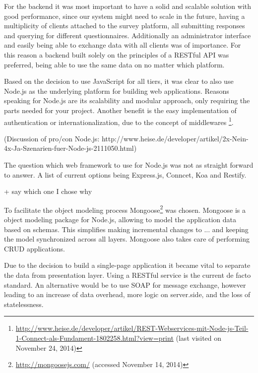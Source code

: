 		For the backend it was most important to have a solid and scalable solution with good performance, since our system might need to scale in the future, having a multiplicity of clients attached to the survey platform, all submitting responses and querying for different questionnaires. Additionally an administrator interface and easily being able to exchange data with all clients was of importance. For this reason a backend built solely on the principles of a RESTful API was preferred, being able to use the same data on no matter which platform.

		Based on the decision to use JavaScript for all tiers, it was clear to also use Node.js as the underlying platform for building web applications. Reasons speaking for Node.js are its scalability and modular approach, only requiring the parts needed for your project. Another benefit is the easy implementation of authentication or internationalization, due to the concept of middlewares \footnote{\url{http://www.heise.de/developer/artikel/REST-Webservices-mit-Node-js-Teil-1-Connect-als-Fundament-1802258.html?view=print} (last visited on November 24, 2014)}. 

				(Discussion of pro/con Node.js: http://www.heise.de/developer/artikel/2x-Nein-4x-Ja-Szenarien-fuer-Node-js-2111050.html)

		The question which web framework to use for Node.js was not as straight forward to answer. A list of current options being Express.js, Conncet, Koa and Restify. 

				+ say which one I chose why


		To facilitate the object modeling process Mongoose\footnote{\url{http://mongoosejs.com/} (accessed November 14, 2014)} was chosen. Mongoose is a object modeling package for Node.js, allowing to model the application data based on schemas. This simplifies making incremental changes to ... and keeping the model synchronized across all layers. 	Mongoose also takes care of performing CRUD applications.


		Due to the decision to build a single-page application it became vital to separate the data from presentation layer. Using a RESTful service is the current de facto standard. An alternative would be to use SOAP for message exchange, however leading to an increase of data overhead, more logic on server.side, and the loss of statelessness.

